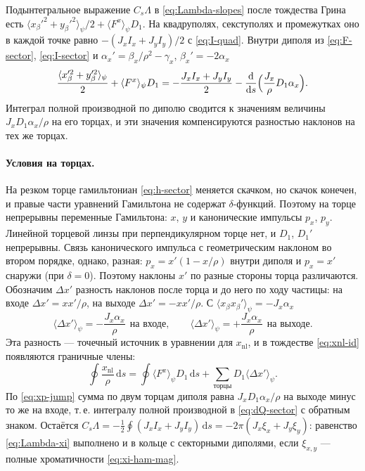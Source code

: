 Подынтегральное выражение $C_s\Lambda$ в \eqref{eq:Lambda-slopes} после тождества Грина есть $\langle x_\beta'^2+y_\beta'^2\rangle_\psi/2+\langle F^x\rangle_\psi D_1$. На квадруполях, секступолях и промежутках оно в каждой точке равно $-(J_xI_x+J_yI_y)/2$ с \eqref{eq:I-quad}. Внутри диполя из \eqref{eq:F-sector}, \eqref{eq:I-sector} и $\alpha_x'=\beta_x/\rho^2-\gamma_x$, $\beta_x'=-2\alpha_x$
\begin{equation}
\label{eq:dQ-sector}
\frac{\langle x_\beta'^2+y_\beta'^2\rangle_\psi}{2}+\langle F^x\rangle_\psi D_1
=-\frac{J_xI_x+J_yI_y}{2}
-\frac{\mathrm{d}}{\mathrm{d}s}\Bigl(\frac{J_x}{\rho}D_1\alpha_x\Bigr).
\end{equation}
Интеграл полной производной по диполю сводится к значениям величины $J_xD_1\alpha_x/\rho$ на его торцах, и эти значения компенсируются разностью наклонов на тех же торцах.

\paragraph{Условия на торцах.} На резком торце гамильтониан \eqref{eq:h-sector} меняется скачком, но скачок конечен, и правые части уравнений Гамильтона не содержат $\delta$-функций. Поэтому на торце непрерывны переменные Гамильтона: $x$, $y$ и канонические импульсы $p_x$, $p_y$. Линейной торцевой линзы при перпендикулярном торце нет, и $D_1$, $D_1'$ непрерывны. Связь канонического импульса с геометрическим наклоном во втором порядке, однако, разная: $p_x=x'(1-x/\rho)$ внутри диполя и $p_x=x'$ снаружи (при $\delta=0$). Поэтому наклоны $x'$ по разные стороны торца различаются. Обозначим $\Delta x'$ разность наклонов после торца и до него по ходу частицы: на входе $\Delta x'=xx'/\rho$, на выходе $\Delta x'=-xx'/\rho$. С $\langle x_\beta x_\beta'\rangle_\psi=-J_x\alpha_x$
\begin{equation}
\label{eq:xp-jump}
\langle\Delta x'\rangle_\psi=-\frac{J_x\alpha_x}{\rho}\ \ \text{на входе},
\qquad
\langle\Delta x'\rangle_\psi=+\frac{J_x\alpha_x}{\rho}\ \ \text{на выходе}.
\end{equation}
Эта разность --- точечный источник в уравнении для $x_{\mathrm{nl}}$, и в тождестве \eqref{eq:xnl-id} появляются граничные члены:
\begin{equation}
\label{eq:xnl-id-edge}
\oint\frac{x_{\mathrm{nl}}}{\rho}\,\mathrm{d}s
=\oint\langle F^x\rangle_\psi D_1\,\mathrm{d}s
+\sum_{\text{торцы}}D_1\langle\Delta x'\rangle_\psi.
\end{equation}
По \eqref{eq:xp-jump} сумма по двум торцам диполя равна $J_xD_1\alpha_x/\rho$ на выходе минус то же на входе, т.\,е. интегралу полной производной в \eqref{eq:dQ-sector} с обратным знаком. Остаётся $C_s\Lambda=-\frac{1}{2}\oint(J_xI_x+J_yI_y)\,\mathrm{d}s=-2\pi(J_x\xi_x+J_y\xi_y)$: равенство \eqref{eq:Lambda-xi} выполнено и в кольце с секторными диполями, если $\xi_{x,y}$ --- полные хроматичности \eqref{eq:xi-ham-mag}.

